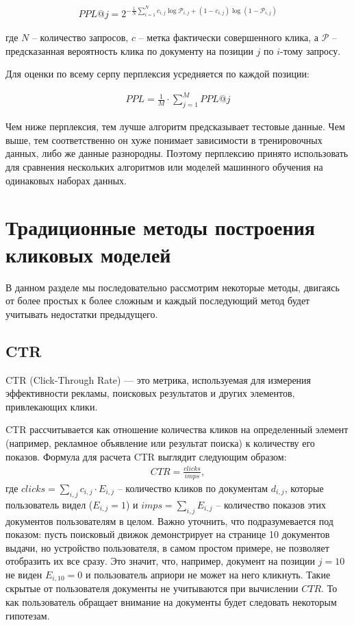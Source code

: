\documentclass[diploma]{nanolab2015}
\begin{document}
\begin{align}
    PPL@j = 2^{-\frac{1}{N}\sum_{i=1}^{N}c_{i,j}\log\mathcal{P}_{i,j} + (1 - c_{i,j})\log(1 - \mathcal{P}_{i,j}) }
\end{align}

где $N$ -- количество запросов, $c$ -- метка фактически совершенного клика, а $\mathcal{P}$ -- предсказанная вероятность клика по документу на позиции $j$ по $i$-тому запросу.

Для оценки по всему серпу перплексия усредняется по каждой позиции:

\begin{align}
    PPL = \frac{1}{M} \cdot \sum_{j=1}^{M} PPL@j
\end{align}

Чем ниже перплексия, тем лучше алгоритм предсказывает тестовые данные. Чем выше, тем соответственно он хуже понимает зависимости в тренировочных данных, либо же данные разнородны. Поэтому перплексию принято использовать для сравнения нескольких алгоритмов или моделей машинного обучения на одинаковых наборах данных.

\section{Традиционные методы построения кликовых моделей}
В данном разделе мы последовательно рассмотрим некоторые методы, двигаясь от более простых к более сложным и каждый последующий метод будет учитывать недостатки предыдущего.
\subsection{CTR}
CTR (Click-Through Rate) — это метрика, используемая для измерения эффективности рекламы, поисковых результатов и других элементов, привлекающих клики. %

CTR рассчитывается как отношение количества кликов на определенный элемент (например, рекламное объявление или результат поиска) к количеству его показов. Формула для расчета CTR выглядит следующим образом:
\begin{align}
    CTR = \frac{clicks}{imps},
\end{align}
где $clicks = \sum_{i,j} c_{i,j} \cdot E_{i,j}$ -- количество кликов по документам $d_{i,j}$, которые пользователь видел ($E_{i,j}=1$) и $imps = \sum_{i,j}E_{i,j}$ -- количество показов этих документов пользователям в целом. Важно уточнить, что подразумевается под показом: пусть поисковый движок демонстрирует на странице 10 документов выдачи, но устройство пользователя, в самом простом примере, не позволяет отобразить их все сразу. Это значит, что, например, документ на позиции $j=10$ не виден $E_{i,10} = 0$ и пользователь априори не может на него кликнуть. Такие скрытые от пользователя документы не учитываются при вычислении $CTR$. То как пользователь обращает внимание на документы будет следовать некоторым гипотезам.
\end{document}
